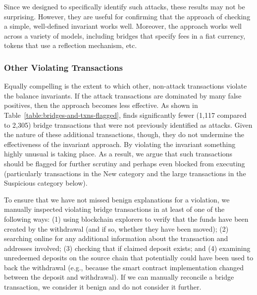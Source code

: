 Since we designed \offlinetool to specifically identify such attacks,
these results may not be surprising.  However, they are useful for
confirming that the approach of checking a simple, well-defined
invariant works well.  Moreover, the approach works well across a
variety of models, including bridges that specify fees in a fiat
currency, tokens that use a reflection mechanism, etc.


\subsubsection{Other Violating Transactions}


Equally compelling
is the extent to which other, non-attack
transactions violate the balance invariants.  If the
attack transactions are dominated by many false positives, then the
approach becomes less effective.
%
As shown in Table~\ref{table:bridges-and-txns-flagged}, \offlinetool
finds significantly fewer (1,117 compared to 2,305) bridge transactions that were
not previously identified as attacks.  Given the nature of these
additional transactions, though, they do not undermine the
effectiveness of the invariant approach.  By violating the invariant
something highly unusual is taking place.  As a result, we argue that
such transactions should be flagged for further scrutiny and perhaps
even blocked from executing (particularly transactions in the New category and the large transactions in
the Suspicious category below).

To ensure that we have not missed benign explanations for a violation,
we manually inspected violating bridge transactions in at least of one
of the following ways: (1) using blockchain explorers to verify that
the funds have been created by the withdrawal (and if so, whether they
have been moved); (2) searching online for any additional information
about the transaction and addresses involved; (3) checking that if
claimed deposit exists; and (4) examining unredeemed
deposits on the source chain that potentially could have been used to
back the withdrawal (e.g., because the smart contract implementation
changed between the deposit and withdrawal).  If we can manually
reconcile a bridge transaction, we consider it benign
and do not consider it further.

